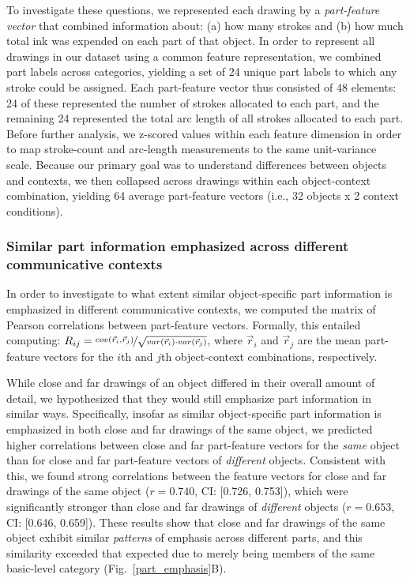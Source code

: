\documentclass[10pt,letterpaper]{article}
\begin{document}
To investigate these questions, we represented each drawing by a \textit{part-feature vector} that combined information about: (a) how many strokes and (b) how much total ink was expended on each part of that object. 
In order to represent all drawings in our dataset using a common feature representation, we combined part labels across categories, yielding a set of 24 unique part labels to which any stroke could be assigned. 
Each part-feature vector thus consisted of 48 elements: 24 of these represented the number of strokes allocated to each part, and the remaining 24 represented the total arc length of all strokes allocated to each part. 
Before further analysis, we z-scored values within each feature dimension in order to map stroke-count and arc-length measurements to the same unit-variance scale. 
Because our primary goal was to understand differences between objects and contexts, we then collapsed across drawings within each object-context combination, yielding 64 average part-feature vectors (i.e., 32 objects x 2 context conditions). 

\vspace*{4px}

\subsubsection{Similar part information emphasized across different communicative contexts}

In order to investigate to what extent similar object-specific part information is emphasized in different communicative contexts, we computed the matrix of Pearson correlations between part-feature vectors. 
Formally, this entailed computing: $R_{ij} =  \nicefrac{cov(\vec{r}_{i}, \vec{r}_{j})}{\sqrt{var(\vec{r}_{i}) \cdot var(\vec{r}_{j})}}$, where $\vec{r}_{i}$ and $\vec{r}_{j}$ are the mean part-feature vectors for the $i$th and $j$th object-context combinations, respectively.

While close and far drawings of an object differed in their overall amount of detail, we hypothesized that they would still emphasize part information in similar ways.
Specifically, insofar as similar object-specific part information is emphasized in both close and far drawings of the same object, we predicted higher correlations between close and far part-feature vectors for the \textit{same} object than for close and far part-feature vectors of \textit{different} objects. 
Consistent with this, we found strong correlations between the feature vectors for close and far drawings of the same object ($r = 0.740$,  CI: [0.726, 0.753]), which were significantly stronger than close and far drawings of \emph{different} objects ($r = 0.653$, CI: [0.646, 0.659]).
These results show that close and far drawings of the same object exhibit similar \emph{patterns} of emphasis across different parts, and this similarity exceeded that expected due to merely being members of the same basic-level category (Fig.~\ref{part_emphasis}B). 
\end{document}
